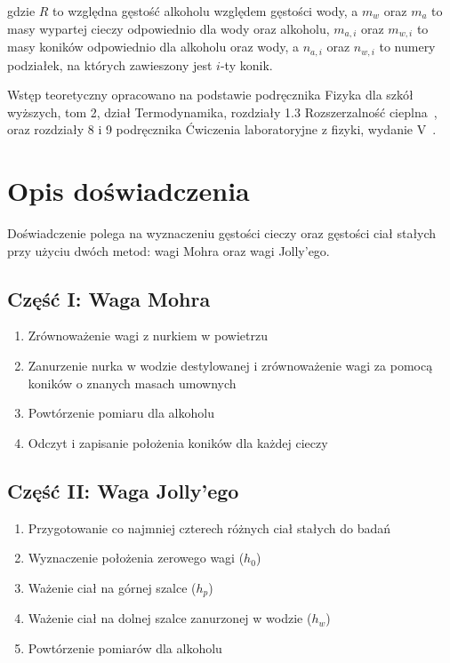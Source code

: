 \documentclass[a4paper,12pt]{article}
\begin{document}
gdzie $R$ to względna gęstość alkoholu względem gęstości wody, a $m_w$ oraz $m_a$ to masy wypartej cieczy odpowiednio dla wody oraz alkoholu, $m_{a, i}$ oraz $m_{w, i}$ to masy koników odpowiednio dla alkoholu oraz wody, a $n_{a, i}$ oraz $n_{w, i}$ to numery podziałek, na których zawieszony jest $i$-ty konik.

Wstęp teoretyczny opracowano na podstawie podręcznika Fizyka dla szkół wyższych, tom 2, dział Termodynamika, rozdziały 1.3 Rozszerzalność cieplna~\cite{fizyka_dla_szkół_wyższych_tom_2}, oraz rozdziały 8 i 9 podręcznika Ćwiczenia laboratoryjne z fizyki, wydanie V~\cite{Drynski1976}.

\section{Opis doświadczenia}

Doświadczenie polega na wyznaczeniu gęstości cieczy oraz gęstości ciał stałych przy użyciu dwóch metod: wagi Mohra oraz wagi Jolly'ego.

\subsection*{Część I: Waga Mohra}
\begin{enumerate}
    \setlength{\itemsep}{0em}
    \item Zrównoważenie wagi z nurkiem w powietrzu
    \item Zanurzenie nurka w wodzie destylowanej i zrównoważenie wagi za pomocą koników o znanych masach umownych
    \item Powtórzenie pomiaru dla alkoholu
    \item Odczyt i zapisanie położenia koników dla każdej cieczy
\end{enumerate}

\subsection*{Część II: Waga Jolly'ego}
\begin{enumerate}
    \setlength{\itemsep}{0em}
    \item Przygotowanie co najmniej czterech różnych ciał stałych do badań
    \item Wyznaczenie położenia zerowego wagi ($h_0$)
    \item Ważenie ciał na górnej szalce ($h_p$)
    \item Ważenie ciał na dolnej szalce zanurzonej w wodzie ($h_w$)
    \item Powtórzenie pomiarów dla alkoholu
\end{enumerate}
\end{document}
